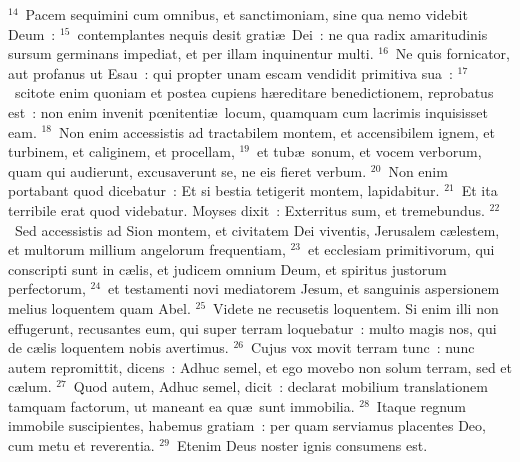${}^{14}$~Pacem sequimini cum omnibus, et sanctimoniam, sine qua nemo videbit Deum~:
${}^{15}$~contemplantes nequis desit grati\ae\ Dei~: ne qua radix amaritudinis sursum germinans impediat, et per illam inquinentur multi.
${}^{16}$~Ne quis fornicator, aut profanus ut Esau~: qui propter unam escam vendidit primitiva sua~:
${}^{17}$~scitote enim quoniam et postea cupiens h\ae reditare benedictionem, reprobatus est~: non enim invenit pœnitenti\ae\ locum, quamquam cum lacrimis inquisisset eam.
${}^{18}$~Non enim accessistis ad tractabilem montem, et accensibilem ignem, et turbinem, et caliginem, et procellam,
${}^{19}$~et tub\ae\ sonum, et vocem verborum, quam qui audierunt, excusaverunt se, ne eis fieret verbum.
${}^{20}$~Non enim portabant quod dicebatur~: Et si bestia tetigerit montem, lapidabitur.
${}^{21}$~Et ita terribile erat quod videbatur. Moyses dixit~: Exterritus sum, et tremebundus.
${}^{22}$~Sed accessistis ad Sion montem, et civitatem Dei viventis, Jerusalem c\ae lestem, et multorum millium angelorum frequentiam,
${}^{23}$~et ecclesiam primitivorum, qui conscripti sunt in c\ae lis, et judicem omnium Deum, et spiritus justorum perfectorum,
${}^{24}$~et testamenti novi mediatorem Jesum, et sanguinis aspersionem melius loquentem quam Abel.
${}^{25}$~Videte ne recusetis loquentem. Si enim illi non effugerunt, recusantes eum, qui super terram loquebatur~: multo magis nos, qui de c\ae lis loquentem nobis avertimus.
${}^{26}$~Cujus vox movit terram tunc~: nunc autem repromittit, dicens~: Adhuc semel, et ego movebo non solum terram, sed et c\ae lum.
${}^{27}$~Quod autem, Adhuc semel, dicit~: declarat mobilium translationem tamquam factorum, ut maneant ea qu\ae\ sunt immobilia.
${}^{28}$~Itaque regnum immobile suscipientes, habemus gratiam~: per quam serviamus placentes Deo, cum metu et reverentia.
${}^{29}$~Etenim Deus noster ignis consumens est.

